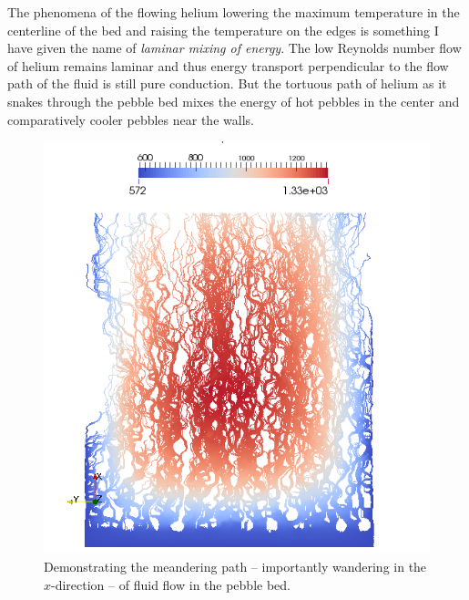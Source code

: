 The phenomena of the flowing helium lowering the maximum temperature in the centerline of the bed and raising the temperature on the edges is something I have given the name of \textit{laminar mixing of energy}. The low Reynolds number flow of helium remains laminar and thus energy transport perpendicular to the flow path of the fluid is still pure conduction. But the tortuous path of helium as it snakes through the pebble bed mixes the energy of hot pebbles in the center and comparatively cooler pebbles near the walls.



\begin{figure}[t]
    \centering
    \includegraphics[width=\singleimagewidth]{figures/lbm/lbm-streamlines}
    \caption{Demonstrating the meandering path -- importantly wandering in the $x$-direction -- of fluid flow in the pebble bed.}\label{fig:lbm-streamlines}
\end{figure}


